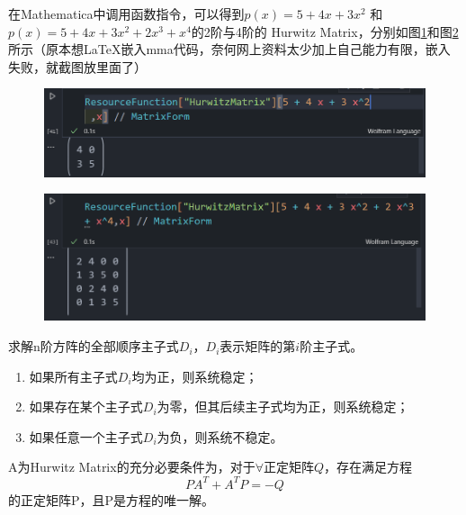 \documentclass[lang=cn,10pt]{elegantbook}
\begin{document}
\begin{example}
	在Mathematica中调用函数指令，可以得到$p(x)=5+4x+3x^2$
	和$p(x)=5+4x+3x^2+2x^3+x^4$的2阶与4阶的
	Hurwitz Matrix，分别如图\ref{hurwitz1}和图\ref{hurwitz2}
	所示（原本想\LaTeX 嵌入mma代码，奈何网上资料太少加上自己能力有限，嵌入失败，就截图放里面了）
	\begin{figure}[h]
		\centering
		\includegraphics[scale=0.6]{img/hurwitz1.png}
		\caption{}
		\label{hurwitz1}
	\end{figure}
	\begin{figure}[h]
		\centering
		\includegraphics[scale=0.6]{img/hurwitz2.png}
		\caption{}
		\label{hurwitz2}
	\end{figure}
\end{example}

\begin{theorem}
	求解n阶方阵的全部顺序主子式$D_i$，$D_i$表示矩阵的第$i$阶主子式。
	\begin{enumerate}
		\item 如果所有主子式$D_i$均为正，则系统稳定；
		\item 如果存在某个主子式$D_i$为零，但其后续主子式均为正，则系统稳定；
		\item 如果任意一个主子式$D_i$为负，则系统不稳定。
	\end{enumerate}
\end{theorem}

\begin{theorem}
	A为Hurwitz Matrix的充分必要条件为，对于$\forall$正定矩阵$Q$，存在满足方程
	\begin{equation*}
		PA^T+A^TP=-Q
	\end{equation*}
	的正定矩阵P，且P是方程的唯一解。
\end{theorem}
\end{document}
